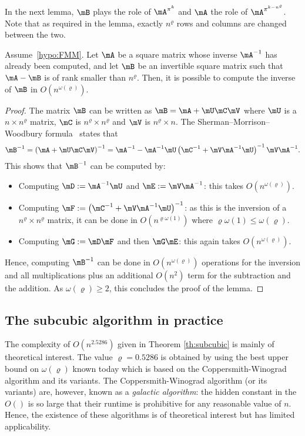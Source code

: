 In the next lemma, $\mB$ plays the role of $\mA^{\pi^k}$ and $\mA$ the role of $\mA^{\pi^{k- n^{\varrho} }}$. Note that as required in the lemma, exactly $ n^\varrho $ rows and columns are changed between the two.
\begin{lem}
    \label{lem:woodbury}
    Assume~\ref{hypo:FMM}. Let $\mA$ be a square matrix whose inverse $\mA^{-1}$ has already been computed, and let $\mB$ be an invertible square matrix such that $\mA-\mB$ is of rank smaller than $ n^{\varrho} $. Then, it is possible to compute the inverse of $\mB$ in $O(n^{\omega(\varrho)})$. 
\end{lem}
\begin{proof}
    The matrix $\mB$ can be written as $\mB=\mA + \mU\mC\mV$ where $\mU$ is a $n\times n^\varrho $ matrix, $\mC$ is $ n^\varrho \times n^\varrho $ and $\mV$ is $ n^\varrho \times n$. The Sherman–Morrison–Woodbury formula~\cite{woodbury1950inverting} states that
    \begin{align*}
        \mB^{-1} = \left(\mA + \mU\mC\mV \right)^{-1} = \mA^{-1} - \mA^{-1}\mU \left(\mC^{-1} + \mV\mA^{-1}\mU \right)^{-1} \mV\mA^{-1}.
    \end{align*}
    This shows that $\mB^{-1}$ can be computed by:
    \begin{itemize}
        \item Computing $\mD:=\mA^{-1}\mU$ and $\mE:=\mV\mA^{-1}$: this takes $O(n^{\omega(\varrho)})$. 
        \item Computing $\mF:=\left(\mC^{-1} + \mV\mA^{-1}\mU \right)^{-1}$: as this is the inversion of a $ n^\varrho \times n^\varrho $ matrix, it can be done in $O(n^{\varrho\omega(1)})$ where $\varrho\omega(1)\le \omega(\varrho)$.
        \item Computing $\mG:=\mD\mF$ and then $\mG\mE$: this again takes $O(n^{\omega(\varrho)})$. 
    \end{itemize}
    Hence, computing $\mB^{-1}$ can be done in $O(n^{\omega(\varrho)})$ operations for the inversion and all   multiplications plus an additional $O(n^2)$ term for the subtraction and the addition. As $\omega(\varrho)\ge2$, this concludes the proof of the lemma.
\end{proof}

\subsection{The subcubic algorithm in practice}

The complexity of $O(n^{2.5286})$ given in Theorem \ref{th:subcubic} is mainly of theoretical interest. The value $\varrho = 0.5286$ is obtained by using the best upper bound  on $\omega(\varrho)$ known today which is based on the Coppersmith-Winograd algorithm and its variants. The Coppersmith-Winograd algorithm (or its variants) are, however, known as a \emph{galactic algorithm}: the hidden constant in the $O()$ is so large that their runtime is prohibitive for any reasonable value of $n$. Hence, the existence of these algorithms is of theoretical interest but has limited applicability.

